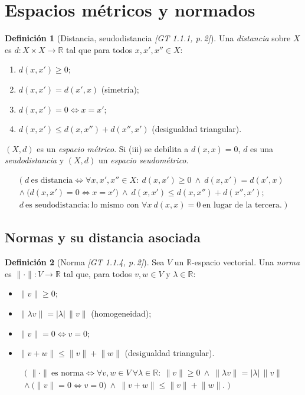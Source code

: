 \documentclass[11pt,a4paper]{article}
\newenvironment{lista}{\leavevmode\begin{itemize}[leftmargin=1.5em,itemsep=1pt,topsep=2pt,parsep=0pt]}{\end{itemize}}
\newcommand{\lgc}[1]{\par\vspace{-3pt}\begin{gather*}\big(\;#1\;\big)\end{gather*}\vspace{-6pt}}
\theoremstyle{definition}
\newtheorem{definicion}{Definición}[section]
\theoremstyle{plain}
\newcommand{\fnt}[1]{{\normalfont\small\itshape\color{gray!150!black}[#1]}}
\newcommand{\R}{\mathbb{R}}
\newcommand{\norm}[1]{\lVert #1 \rVert}
\begin{document}
\tableofcontents

\section{Espacios métricos y normados}\label{sec:metricos}

\begin{definicion}[Distancia, seudodistancia \fnt{GT 1.1.1, p.\,2}]
Una \emph{distancia} sobre $X$ es $d:X\times X\to\R$ tal que para todos $x,x',x''\in X$:
\begin{enumerate}[label=(\roman*),leftmargin=2.2em,itemsep=0pt]
\item $d(x,x')\ge 0$;
\item $d(x,x')=d(x',x)$ (simetría);
\item $d(x,x')=0 \iff x=x'$;
\item $d(x,x')\le d(x,x'')+d(x'',x')$ (desigualdad triangular).
\end{enumerate}
$(X,d)$ es un \emph{espacio métrico}. Si (iii) se debilita a $d(x,x)=0$, $d$ es una \emph{seudodistancia} y $(X,d)$ un \emph{espacio seudométrico}.
\lgc{d\ \text{es distancia}\iff \forall x,x',x''\in X:\
d(x,x')\ge0\ \wedge\ d(x,x')=d(x',x)\\
\wedge\ \big(d(x,x')=0\Leftrightarrow x=x'\big)\ \wedge\ d(x,x')\le d(x,x'')+d(x'',x');\\
d\ \text{es seudodistancia}: \text{lo mismo con } \forall x\ d(x,x)=0\ \text{en lugar de la tercera}.}
\end{definicion}


\subsection{Normas y su distancia asociada}

\begin{definicion}[Norma \fnt{GT 1.1.4, p.\,2}]
Sea $V$ un $\R$-espacio vectorial. Una \emph{norma} es $\norm{\cdot}:V\to\R$ tal que, para todos $v,w\in V$ y $\lambda\in\R$:
\begin{lista}
\item $\norm{v}\ge 0$;
\item $\norm{\lambda v}=|\lambda|\,\norm{v}$ (homogeneidad);
\item $\norm{v}=0\iff v=0$;
\item $\norm{v+w}\le\norm{v}+\norm{w}$ (desigualdad triangular).
\end{lista}
\lgc{\norm{\cdot}\ \text{es norma}\iff \forall v,w\in V\ \forall\lambda\in\R:\
\norm{v}\ge0\ \wedge\ \norm{\lambda v}=|\lambda|\,\norm{v}\\
\wedge\ \big(\norm{v}=0\Leftrightarrow v=0\big)\ \wedge\ \norm{v+w}\le\norm{v}+\norm{w}.}
\end{definicion}
\end{document}
